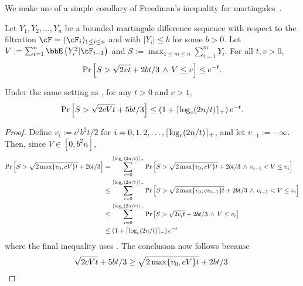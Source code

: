 We make use of a simple corollary of Freedman's inequality for
martingales~\citep[Theorem 1.6]{Fre75}.
\begin{theorem}
  \label{thm:freedman}
  Let $Y_1, Y_2, \dotsc, Y_n$ be a bounded martingale difference
  sequence with respect to the filtration $\cF = (\cF_i)_{1 \leq i
  \leq n}$ and with $|Y_i| \leq b$ for some $b>0$.
  Let $V := \sum_{i=1}^n \EE{Y_i^2|\cF_{i-1}}$ and $S := \max_{1 \leq
  m \leq n} \sum_{i=1}^m Y_i$.
  For all $t, v > 0$,
  \[
    \Pr\left[
      S > \sqrt{2vt} + 2bt/3
      \,\wedge\,
      V \leq v
    \right]
    \leq e^{-t}
    .
  \]
\end{theorem}
\begin{corollary}
  \label{cor:freedman}
  Under the same setting as , for any $t > 0$ and
  $c > 1$,
  \[
    \Pr\left[
      S > \sqrt{2cVt} + 5bt/3
    \right]
    \leq
    \left( 1 + \lceil\log_c(2n/t)\rceil_+ \right)
    e^{-t}
    .
  \]
\end{corollary}
\begin{proof}
  Define $v_i := c^i b^2t/2$ for $i = 0, 1, 2, \dotsc, \lceil
  \log_c(2n/t) \rceil_+$, and let $v_{-1} := -\infty$.
  Then, since $V \in [0,b^2n]$,
  \begin{align*}
    \Pr\left[
      S > \sqrt{2\max\{v_0,cV\}t} + 2bt/3
    \right]
    & =
    \sum_{i=0}^{\lceil\log_c(2n/t)\rceil_+}
    \Pr\left[
      S > \sqrt{2\max\{v_0,cV\}t} + 2bt/3
      \,\wedge\, v_{i-1} < V \leq v_i
    \right]
    \\
    & \leq
    \sum_{i=0}^{\lceil\log_c(2n/t)\rceil_+}
    \Pr\left[
      S > \sqrt{2\max\{v_0,cv_{i-1}\}t} + 2bt/3
      \,\wedge\, v_{i-1} < V \leq v_i
    \right]
    \\
    & \leq
    \sum_{i=0}^{\lceil\log_c(2n/t)\rceil_+}
    \Pr\left[
      S > \sqrt{2v_it} + 2bt/3
      \,\wedge\, V \leq v_i
    \right]
    \\
    & \leq
    \left( 1 + \lceil\log_c(2n/t)\rceil_+ \right)
    e^{-t}
  \end{align*}
  where the final inequality uses .
  The conclusion now follows because
  \[
    \sqrt{2cVt} + 5bt/3
    \geq \sqrt{2\max\{v_0,cV\}t} + 2bt/3
    .
    \qedhere
  \]
\end{proof}

